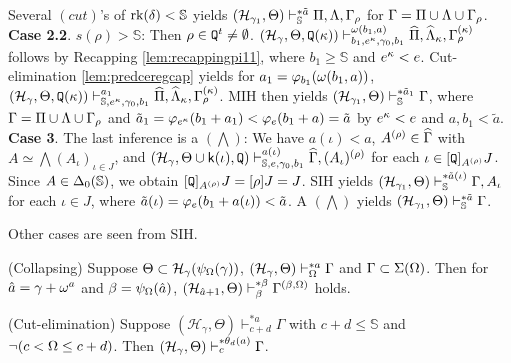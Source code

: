 \documentclass{article}
\newcommand{\mS}{\mathbb{S}}
\begin{document}
Several $(cut)$'s of $\rk(\del)<\mS$ yields
$
(\mathcal{H}_{\gam_{1}},\Theta
)
\vdash^{* \tilde{a}}_{\mS}
\Pi,\Lam,\Gam_{\rho}
$ for $\Gamma=\Pi\cup\Lambda\cup\Gamma_{\rho}$.
 \\
\textbf{Case 2.2}. $s(\rho)>\mS$:
Then $\rho\in{\tt Q}^{t}\neq\emptyset$.
$
(\mathcal{H}_{\gamma},\Theta,
{\tt Q}(\kappa)
)
\vdash^{\omega(b_{1},a)}_{b_{1},e^{\kappa},\gamma_{0}, b_{1}}
\widehat{\Pi},\widehat{\Lambda}_{\kappa},\Gamma_{\rho}^{(\kappa)}
$ follows by Recapping \ref{lem:recappingpi11},
where $b_{1}\geq\mS$ and
$e^{\kappa}<e$.
Cut-elimination \ref{lem:predceregcap} yields for
$a_{1}=\varphi_{b_{1}}(\omega(b_{1},a))$,
$
(\mathcal{H}_{\gamma},\Theta,
{\tt Q}(\kap)
)
\vdash^{a_{1}}_{\mS,e^{\kap},\gam_{0}, b_{1}}
\widehat{\Pi},\widehat{\Lam}_{\kap},\Gamma_{\rho}^{(\kap)}
$.
MIH then yields
$
(\mathcal{H}_{\gam_{1}},\Theta
)
\vdash^{* \tilde{a}_{1}}_{\mS}
\Gam
$,
where $\Gamma=\Pi\cup\Lambda\cup\Gamma_{\rho}$ and
$\tilde{a}_{1}=\varphi_{e^{\kappa}}(b_{1}+a_{1})<\varphi_{e}(b_{1}+a)=\tilde{a}$ by 
$e^{\kappa}<e$
and $a,b_{1}<\tilde{a}$.
\\
\textbf{Case 3}.
The last inference is a $(\bigwedge)$:
We have $a(\iota)<a$, $A^{(\rho)}\in\widehat{\Gamma}$ with $A\simeq\bigwedge(A_{\iota})_{\iota\in J}$,
and
$
(\mathcal{H}_{\gamma},\Tht\cup\sfk(\iota),{\tt Q})
\vdash^{a(\iota)}_{\mS,e,\gam_{0}, b_{1}}
\widehat{\Gam},(A_{\iota})^{(\rho)}
$ for each 
$\iota\in [{\tt Q}]_{A^{(\rho)}}J$.
Since $A\in\Del_{0}(\mS)$, we obtain 
$[{\tt Q}]_{A^{(\rho)}}J=[\rho]J=J$.
SIH yields
$
(\mathcal{H}_{\gam_{1}},\Tht)
\vdash^{* \tilde{a}(\iota)}_{\mS}
\Gam,A_{\iota}
$
for each $\iota\in J$, where $\tilde{a}(\iota)=\varphi_{e}(b_{1}+a(\iota))<\tilde{a}$.
A $(\bigwedge)$ yields
$
(\mathcal{H}_{\gam_{1}},\Tht)
\vdash^{* \tilde{a}}_{\mS}
\Gam
$.

Other cases are seen from SIH.
\eprf

\bprp\label{prp:collapsingOme}{\rm (Collapsing)}
Suppose 
$
\Theta\subset{\cal H}_{\gamma}(\psi_{\Omega}(\gamma))
$,
$({\cal H}_{\gamma},\Theta)\vdash^{* a}_{\Omega}\Gamma$
and $\Gamma\subset\Sigma(\Omega)$. 
Then for $\hat{a}=\gamma+\omega^{a}$ and $\beta=\psi_{\Omega}(\hat{a})$,
$({\cal H}_{\hat{a}+1},\Theta)\vdash^{* \beta}_{\beta}\Gamma^{(\beta,\Omega)}$ holds.
\eprp

\bprp\label{lem:predcepi11Ome}{\rm (Cut-elimination)}
Suppose
$(\mathcal{H}_{\gamma},\Theta)\vdash^{* a}_{c+d}\Gamma$
with $c+d\leq\mS$ and $\lnot(c<\Omega\leq c+d)$.
Then $(\mathcal{H}_{\gamma},\Theta)\vdash^{* \theta_{d}(a)}_{c}\Gamma$.
\eprp
\end{document}
